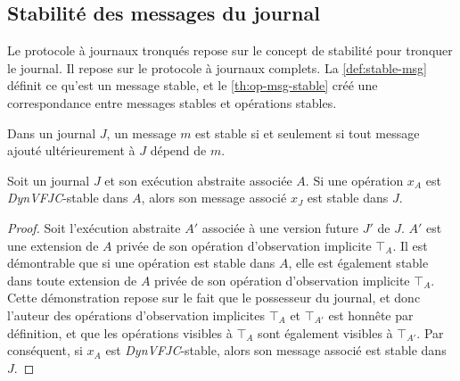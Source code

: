 

\subsection{Stabilité des messages du journal}\label{subsec:msg-stable}

Le protocole à journaux tronqués repose sur le concept de stabilité pour tronquer le journal.
Il repose sur le protocole à journaux complets.
La \autoref{def:stable-msg} définit ce qu'est un message stable, et le \autoref{th:op-msg-stable} créé une correspondance entre messages stables et opérations stables.

\begin{definition}\label{def:stable-msg}
Dans un journal $J$, un message $m$ est stable si et seulement si tout message ajouté ultérieurement à $J$ dépend de $m$.
\end{definition}

\begin{theorem}\label{th:op-msg-stable}
Soit un journal $J$ et son exécution abstraite associée $A$.
Si une opération $x_A$ est \emph{DynVFJC}-stable dans $A$, alors son message associé $x_J$ est stable dans $J$.
\end{theorem}

\begin{proof}
Soit l'exécution abstraite $A'$ associée à une version future $J'$ de $J$.
$A'$ est une extension de $A$ privée de son opération d'observation implicite $\top_A$.
Il est démontrable que si une opération est stable dans $A$, elle est également stable dans toute extension de $A$ privée de son opération d'observation implicite $\top_A$.
Cette démonstration repose sur le fait que le possesseur du journal, et donc l'auteur des opérations d'observation implicites $\top_A$ et $\top_{A'}$ est honnête par définition, et que les opérations visibles à $\top_A$ sont également visibles à $\top_{A'}$.
Par conséquent, si $x_A$ est \emph{DynVFJC}-stable, alors son message associé est stable dans $J$.
\end{proof}


